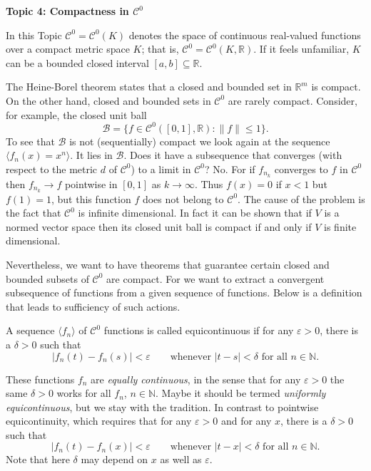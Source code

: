 \documentclass[11pt]{article}
\begin{document}
\begin{center}
  \textbf{Topic 4: Compactness in $\mathcal{C}^0$}
\end{center}

In this Topic $\mathcal{C}^0 = \mathcal{C}^0(K)$ denotes the space of continuous real-valued functions over a compact metric space $K$; that is, $\mathcal{C}^0 = \mathcal{C}^0(K, \mathbb{R})$.
If it feels unfamiliar, $K$ can be a bounded closed interval $[a,b] \subseteq \mathbb{R}$.

The Heine-Borel theorem states that a closed and bounded set in $\mathbb{R}^m$ is compact.
On the other hand, closed and bounded sets in $\mathcal{C}^0$ are rarely compact.
Consider, for example, the closed unit ball
\[
  \mathcal{B} = \{ f \in \mathcal{C}^0([0,1], \mathbb{R}) \colon \| f \| \leqslant 1 \}.
\]
To see that $\mathcal{B}$ is not (sequentially) compact we look again at the sequence $\langle f_n(x) = x^n \rangle$.
It lies in $\mathcal{B}$.
Does it have a subsequence that converges (with respect to the metric $d$ of $\mathcal{C}^0$) to a limit in $\mathcal{C}^0$?
No.  For if $f_{n_k}$ converges to $f$ in $\mathcal{C}^0$ then $f_{n_k} \to f$ pointwise in $[0,1]$ as $k \to \infty$.
Thus $f(x) = 0$ if $x < 1$ but $f(1) = 1$, but this function $f$ does not belong to $\mathcal{C}^0$.
The cause of the problem is the fact that $\mathcal{C}^0$ is infinite dimensional.
In fact it can be shown that if $V$ is a normed vector space then its closed unit ball is compact if and only if $V$ is finite dimensional.

Nevertheless, we want to have theorems that guarantee certain closed and bounded subsets of $\mathcal{C}^0$ are compact.
For we want to extract a convergent subsequence of functions from a given sequence of functions.
Below is a definition that leads to sufficiency of such actions.

\begin{defn}
  A sequence $\langle f_n \rangle$ of $\mathcal{C}^0$ functions is called \textsf{equicontinuous} if for any $\varepsilon > 0$, there is a $\delta > 0$ such that
  \[
    |f_n(t) - f_n(s)| < \varepsilon \qquad \text{whenever $|t-s| < \delta$ for all $n \in \mathbb{N}$.}
  \]
\end{defn}

  These functions $f_n$ are \textit{equally continuous}, in the sense that for any $\varepsilon > 0$ the same $\delta > 0$ works for all $f_n$, $n \in \mathbb{N}$.
  Maybe it should be termed \textit{uniformly equicontinuous}, but we stay with the tradition.
  In contrast to pointwise equicontinuity, which requires that for any $\varepsilon > 0$ and for any $x$, there is a $\delta > 0$ such that
  \[
    |f_n(t) - f_n(x)| < \varepsilon \qquad \text{whenever $|t-x| < \delta$ for all $n \in \mathbb{N}$.}
  \]
  Note that here $\delta$ may depend on $x$ as well as $\varepsilon$.
\end{document}
